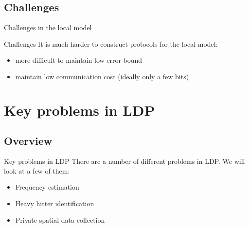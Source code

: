 \documentclass[aspectratio=43]{beamer}
\begin{document}

\subsection{Challenges}

\begin{frame}{Challenges in the local model}
    \begin{alertblock}{Challenges}
        It is much harder to construct protocols for the local model:
        \begin{itemize}
            \item more difficult to maintain low error-bound
            \item maintain low communication cost (ideally only a few bits)
        \end{itemize}
    \end{alertblock}
\end{frame}


\section{Key problems in LDP}

\subsection{Overview}

\begin{frame}{Key problems in LDP}
    There are a number of different problems in LDP. We will look at a few of them:\\
    \bigskip
    \begin{itemize}
        \item Frequency estimation
        \item Heavy hitter identification
        \item Private spatial data collection
    \end{itemize}
\end{frame}

\end{document}
